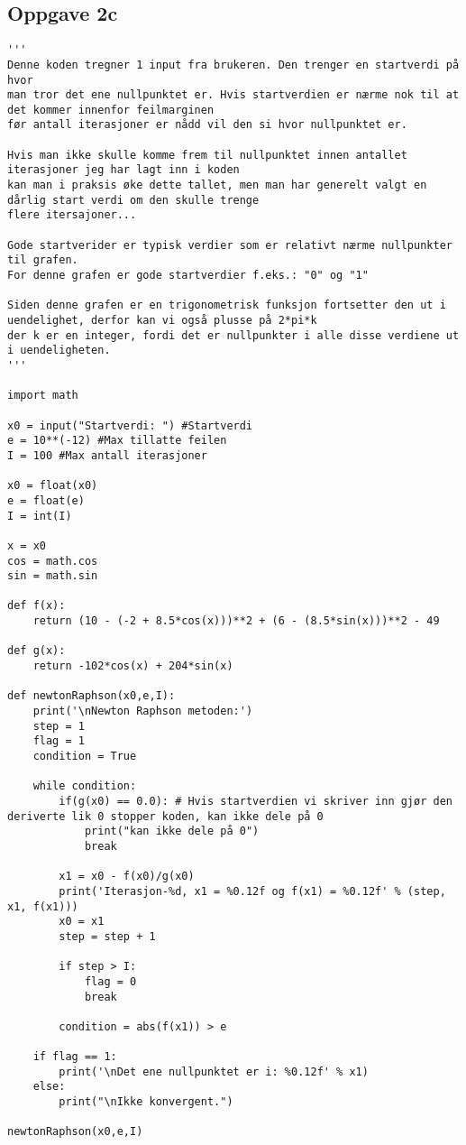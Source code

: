 \subsection{Oppgave 2c}
\begin{lstlisting}
'''
Denne koden tregner 1 input fra brukeren. Den trenger en startverdi på hvor
man tror det ene nullpunktet er. Hvis startverdien er nærme nok til at det kommer innenfor feilmarginen
før antall iterasjoner er nådd vil den si hvor nullpunktet er.

Hvis man ikke skulle komme frem til nullpunktet innen antallet iterasjoner jeg har lagt inn i koden
kan man i praksis øke dette tallet, men man har generelt valgt en dårlig start verdi om den skulle trenge
flere itersajoner...

Gode startverider er typisk verdier som er relativt nærme nullpunkter til grafen. 
For denne grafen er gode startverdier f.eks.: "0" og "1"

Siden denne grafen er en trigonometrisk funksjon fortsetter den ut i uendelighet, derfor kan vi også plusse på 2*pi*k
der k er en integer, fordi det er nullpunkter i alle disse verdiene ut i uendeligheten.
'''

import math

x0 = input("Startverdi: ") #Startverdi
e = 10**(-12) #Max tillatte feilen
I = 100 #Max antall iterasjoner

x0 = float(x0)
e = float(e)
I = int(I)

x = x0
cos = math.cos
sin = math.sin

def f(x):
    return (10 - (-2 + 8.5*cos(x)))**2 + (6 - (8.5*sin(x)))**2 - 49

def g(x):
    return -102*cos(x) + 204*sin(x)

def newtonRaphson(x0,e,I):
    print('\nNewton Raphson metoden:')
    step = 1
    flag = 1
    condition = True

    while condition:
        if(g(x0) == 0.0): # Hvis startverdien vi skriver inn gjør den deriverte lik 0 stopper koden, kan ikke dele på 0
            print("kan ikke dele på 0")
            break
        
        x1 = x0 - f(x0)/g(x0)
        print('Iterasjon-%d, x1 = %0.12f og f(x1) = %0.12f' % (step, x1, f(x1)))
        x0 = x1
        step = step + 1

        if step > I:
            flag = 0
            break

        condition = abs(f(x1)) > e

    if flag == 1:
        print('\nDet ene nullpunktet er i: %0.12f' % x1)
    else:
        print("\nIkke konvergent.")

newtonRaphson(x0,e,I)
\end{lstlisting}